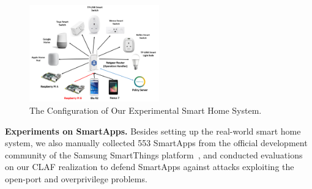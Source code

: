 \documentclass[letterpaper,12pt]{article}
\begin{document}
\begin{figure}[!htb]
        \centering
        \includegraphics[width=0.5\textwidth]{smarthomesys.png}
        \caption{The Configuration of Our Experimental Smart Home System.}
        \label{fig:smarthomesys}
\end{figure}

\textbf{Experiments on SmartApps.} 
Besides setting up the real-world smart home system, we also manually collected 553 SmartApps from the official development community of the Samsung SmartThings platform~\cite{smartthingscommunity}, and conducted evaluations on our CLAF realization to defend SmartApps against attacks exploiting the open-port and overprivilege problems.
\end{document}
